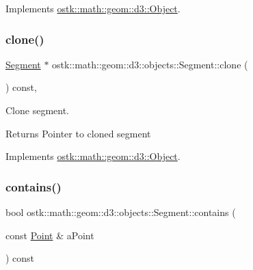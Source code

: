 Implements \hyperlink{classostk_1_1math_1_1geom_1_1d3_1_1_object_ae9194dd6d2bb4df09292ffc84dccdb1d}{ostk\+::math\+::geom\+::d3\+::\+Object}.

\mbox{\label{classostk_1_1math_1_1geom_1_1d3_1_1objects_1_1_segment_ab6d2215382c1b9fbdbd98501956d679d}} 
\subsubsection{\texorpdfstring{clone()}{clone()}}
{\footnotesize\ttfamily \hyperlink{classostk_1_1math_1_1geom_1_1d3_1_1objects_1_1_segment}{Segment} $\ast$ ostk\+::math\+::geom\+::d3\+::objects\+::\+Segment\+::clone (\begin{DoxyParamCaption}{ }\end{DoxyParamCaption}) const\hspace{0.3cm}{\ttfamily [override]}, {\ttfamily [virtual]}}



Clone segment. 

\begin{DoxyReturn}{Returns}
Pointer to cloned segment 
\end{DoxyReturn}


Implements \hyperlink{classostk_1_1math_1_1geom_1_1d3_1_1_object_a676013f9555f6492687f9809b2db887b}{ostk\+::math\+::geom\+::d3\+::\+Object}.

\mbox{\label{classostk_1_1math_1_1geom_1_1d3_1_1objects_1_1_segment_a07d2c8bc8f734b3a99fb4f11610f9fab}} 
\subsubsection{\texorpdfstring{contains()}{contains()}}
{\footnotesize\ttfamily bool ostk\+::math\+::geom\+::d3\+::objects\+::\+Segment\+::contains (\begin{DoxyParamCaption}\item[{const \hyperlink{classostk_1_1math_1_1geom_1_1d3_1_1objects_1_1_point}{Point} \&}]{a\+Point }\end{DoxyParamCaption}) const}



